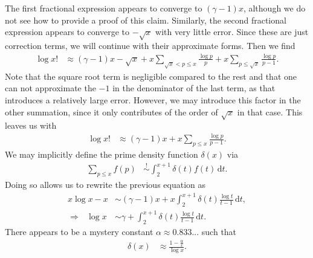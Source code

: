 \documentclass[english, parskip=full]{scrartcl}
\newcommand{\intx}{}
\begin{document}
The first fractional expression appears to converge to $(\gamma-1) x$, although we do not see how to provide a proof of this claim.
Similarly, the second fractional expression appears to converge to $-\sqrt{x}$ with very little error.
Since these are just correction terms, we will continue with their approximate forms.
Then we find
\begin{align}
\log x! &\approx (\gamma - 1)x - \sqrt{x} + x\sum_{\sqrt{x} < p\le x} \frac{\log p}{p} + x\sum_{p\le \sqrt{x}} \frac{\log p}{p-1}.
\end{align}
Note that the square root term is negligible compared to the rest and that one can not approximate the $-1$ in the denominator of the last term, as that introduces a relatively large error.
However, we may introduce this factor in the other summation, since it only contributes of the order of $\sqrt{x}$ in that case.
This leaves us with
\begin{align}
\log x! &\approx (\gamma-1) x + x \sum_{p\le x} \frac{\log p}{p-1}.
\end{align}
We may implicitly define the prime density function $\delta(x)$ via
\begin{align}
\sum_{p\le x} f(p) &\overset{!}{\sim} \intx\int_{2}^{x+1} \delta(t) f(t)\, \mathrm{d}t.
\end{align}
Doing so allows us to rewrite the previous equation as
\begin{align}
x\log x - x &\sim (\gamma-1) x + x \intx\int_{2}^{x+1}\delta(t) \frac{\log t}{t-1}\, \mathrm{d}t,\\
\Rightarrow\ \ \ \log x &\sim \gamma + \intx\int_{2}^{x+1} \delta(t) \frac{\log t}{t-1}\, \mathrm{d}t.
\end{align}
There appears to be a mystery constant $\alpha \approx 0.833...$ such that
\begin{align}
\delta(x) &\approx \frac{1 - \frac{\alpha}{x}}{\log x}.
\end{align}







\end{document}
